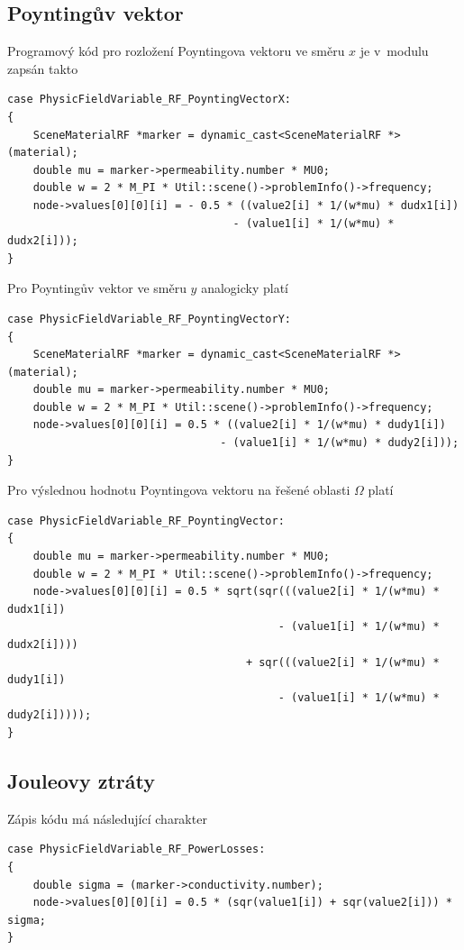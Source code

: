 \subsection*{Poyntingův vektor}
Programový kód pro rozložení Poyntingova vektoru ve směru $x$ je v~modulu zapsán takto
\begin{verbatim}
case PhysicFieldVariable_RF_PoyntingVectorX:
{
    SceneMaterialRF *marker = dynamic_cast<SceneMaterialRF *>(material);
    double mu = marker->permeability.number * MU0;
    double w = 2 * M_PI * Util::scene()->problemInfo()->frequency;
    node->values[0][0][i] = - 0.5 * ((value2[i] * 1/(w*mu) * dudx1[i]) 
                                   - (value1[i] * 1/(w*mu) * dudx2[i]));
}
\end{verbatim}
Pro Poyntingův vektor ve směru $y$ analogicky platí
\begin{verbatim}
case PhysicFieldVariable_RF_PoyntingVectorY:
{
    SceneMaterialRF *marker = dynamic_cast<SceneMaterialRF *>(material);
    double mu = marker->permeability.number * MU0;
    double w = 2 * M_PI * Util::scene()->problemInfo()->frequency;
    node->values[0][0][i] = 0.5 * ((value2[i] * 1/(w*mu) * dudy1[i]) 
                                 - (value1[i] * 1/(w*mu) * dudy2[i]));
}
\end{verbatim}
Pro výslednou hodnotu Poyntingova vektoru na řešené oblasti $\Omega$ platí
\begin{verbatim}
case PhysicFieldVariable_RF_PoyntingVector:
{
    double mu = marker->permeability.number * MU0;
    double w = 2 * M_PI * Util::scene()->problemInfo()->frequency;
    node->values[0][0][i] = 0.5 * sqrt(sqr(((value2[i] * 1/(w*mu) * dudx1[i]) 
                                          - (value1[i] * 1/(w*mu) * dudx2[i]))) 
                                     + sqr(((value2[i] * 1/(w*mu) * dudy1[i]) 
                                          - (value1[i] * 1/(w*mu) * dudy2[i]))));
}
\end{verbatim}

\subsection*{Jouleovy ztráty}
Zápis kódu má následující charakter
\begin{verbatim}
case PhysicFieldVariable_RF_PowerLosses:
{
    double sigma = (marker->conductivity.number);
    node->values[0][0][i] = 0.5 * (sqr(value1[i]) + sqr(value2[i])) * sigma;
}
\end{verbatim}
